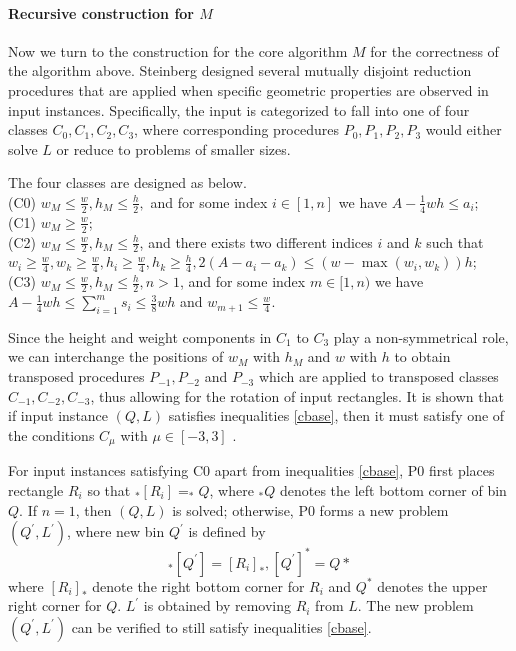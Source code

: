 \documentclass[sigplan,screen,nonacm]{acmart}\settopmatter{printfolios=true,printccs=false,printacmref=false}
\begin{document}
\paragraph{Recursive construction for $M$} Now we turn to the construction for the core algorithm $M$ for the correctness of the algorithm above. Steinberg designed several mutually disjoint reduction procedures that are applied when specific geometric properties are observed in input instances. Specifically, the input is categorized to fall into one of four classes $C_0, C_1, C_2, C_3$, where corresponding procedures $P_0,P_1, P_2,P_3$ would either solve $L$ or reduce to problems of smaller sizes.
\par The four classes are designed as below.\\
(C0) $w_M\leq \frac{w}{2}, h_M\leq\frac{h}{2},$ and for some index $i\in[1,n]$ we have $A-\frac{1}{4}wh\leq a_i$; \\
(C1) $w_M\geq \frac{w}{2}$; \\
(C2) $w_M\leq \frac{w}{2}, h_M\leq\frac{h}{2}$, and there exists two different indices $i$ and $k$ such that $w_i\geq \frac{w}{4}, w_k\geq\frac{w}{4}, h_i\geq\frac{w}{4}, h_k\geq\frac{h}{4}, 2(A-a_i-a_k)\leq (w-\max(w_i, w_k))h$; \\
(C3) $w_M\leq\frac{w}{2}, h_M\leq\frac{h}{2}, n>1$, and for some index $m\in[1,n)$ we have $A-\frac{1}{4}wh\leq\sum_{i=1}^{m}s_i\leq\frac{3}{8}wh$ and $w_{m+1}\leq\frac{w}{4}$. 
\par Since the height and weight components in $C_1$ to $C_3$ play a non-symmetrical role, we can interchange the positions of $w_M$ with $h_M$ and $w$ with $h$ to obtain transposed procedures $P_{-1}, P_{-2}$ and $P_{-3}$ which are applied to transposed classes $C_{-1}, C_{-2}, C_{-3}$, thus allowing for the rotation of input rectangles. It is shown that if input instance $(Q,L)$ satisfies inequalities \ref{cbase}, then it must satisfy one of the conditions $C_\mu$ with $\mu\in[-3,3]$ \cite{steinberg1997strip}.
\par For input instances satisfying C0 apart from inequalities \ref{cbase}, P0 first places rectangle $R_i$ so that $_*[R_i]=_*Q$, where $_*Q$ denotes the left bottom corner of bin $Q$. If $n=1$, then $(Q,L)$ is solved; otherwise, P0 forms a new problem $(Q^\prime, L^\prime)$, where new bin $Q^\prime$ is defined by
\begin{equation}
	_*[Q^\prime]=[R_i]_*, [Q^\prime]^*=Q*
\end{equation}
where $[R_i]_*$ denote the right bottom corner for $R_i$ and $Q^*$ denotes the upper right corner for $Q$. $L^\prime$ is obtained by removing $R_i$ from $L$. The new problem $(Q^\prime, L^\prime)$ can be verified to still satisfy inequalities \ref{cbase}.
\end{document}
